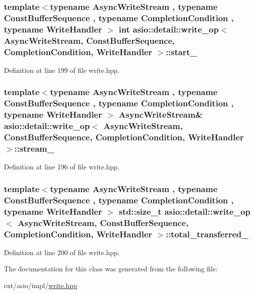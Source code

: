 \subsubsection[{start\+\_\+}]{\setlength{\rightskip}{0pt plus 5cm}template$<$typename Async\+Write\+Stream , typename Const\+Buffer\+Sequence , typename Completion\+Condition , typename Write\+Handler $>$ int {\bf asio\+::detail\+::write\+\_\+op}$<$ Async\+Write\+Stream, Const\+Buffer\+Sequence, Completion\+Condition, Write\+Handler $>$\+::start\+\_\+}\label{classasio_1_1detail_1_1write__op_abe9c4c673906b3a725db21a0089b0578}


Definition at line 199 of file write.\+hpp.

\hypertarget{classasio_1_1detail_1_1write__op_a9f06de304a3a9944f68dd494e777827b}{}
\subsubsection[{stream\+\_\+}]{\setlength{\rightskip}{0pt plus 5cm}template$<$typename Async\+Write\+Stream , typename Const\+Buffer\+Sequence , typename Completion\+Condition , typename Write\+Handler $>$ Async\+Write\+Stream\& {\bf asio\+::detail\+::write\+\_\+op}$<$ Async\+Write\+Stream, Const\+Buffer\+Sequence, Completion\+Condition, Write\+Handler $>$\+::stream\+\_\+}\label{classasio_1_1detail_1_1write__op_a9f06de304a3a9944f68dd494e777827b}


Definition at line 196 of file write.\+hpp.

\hypertarget{classasio_1_1detail_1_1write__op_abda37e9a75c329b5c6c7ffa641b18d25}{}
\subsubsection[{total\+\_\+transferred\+\_\+}]{\setlength{\rightskip}{0pt plus 5cm}template$<$typename Async\+Write\+Stream , typename Const\+Buffer\+Sequence , typename Completion\+Condition , typename Write\+Handler $>$ std\+::size\+\_\+t {\bf asio\+::detail\+::write\+\_\+op}$<$ Async\+Write\+Stream, Const\+Buffer\+Sequence, Completion\+Condition, Write\+Handler $>$\+::total\+\_\+transferred\+\_\+}\label{classasio_1_1detail_1_1write__op_abda37e9a75c329b5c6c7ffa641b18d25}


Definition at line 200 of file write.\+hpp.



The documentation for this class was generated from the following file\+:\begin{DoxyCompactItemize}
\item 
ext/asio/impl/\hyperlink{impl_2write_8hpp}{write.\+hpp}\end{DoxyCompactItemize}
